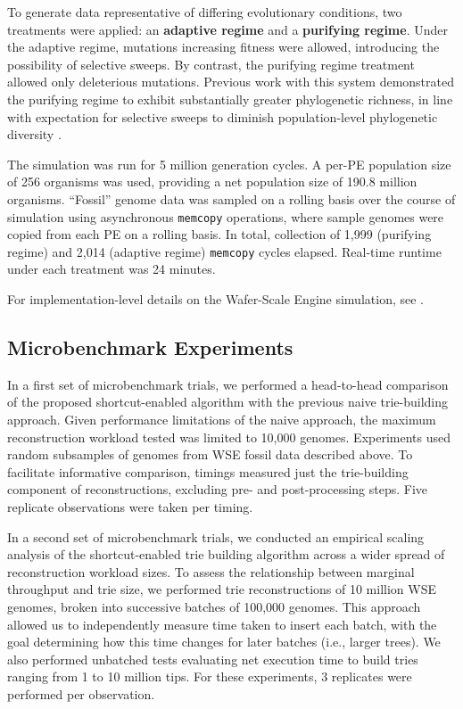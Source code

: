 To generate data representative of differing evolutionary conditions, two treatments were applied: an
\textbf{adaptive regime} and a \textbf{purifying regime}.
Under the adaptive regime, mutations increasing fitness were allowed, introducing the possibility of selective sweeps.
By contrast, the purifying regime treatment allowed only deleterious mutations.
Previous work with this system demonstrated the purifying regime to exhibit substantially greater phylogenetic richness, in line with expectation for selective sweeps to diminish population-level phylogenetic diversity \citep{moreno2024trackable}.

The simulation was run for 5 million generation cycles.
A per-PE population size of 256 organisms was used, providing a net population size of 190.8 million organisms.
``Fossil'' genome data was sampled on a rolling basis over the course of simulation using asynchronous \texttt{memcopy} operations, where sample genomes were copied from each PE on a rolling basis.
In total, collection of 1,999 (purifying regime) and 2,014 (adaptive regime) \texttt{memcopy} cycles elapsed.
Real-time runtime under each treatment was 24 minutes.

For implementation-level details on the Wafer-Scale Engine simulation, see \citep{moreno2024trackable}.

\subsection{Microbenchmark Experiments}

In a first set of microbenchmark trials, we performed a head-to-head comparison of the proposed shortcut-enabled algorithm with the previous naive trie-building approach.
Given performance limitations of the naive approach, the maximum reconstruction workload tested was limited to 10,000 genomes.
Experiments used random subsamples of genomes from WSE fossil data described above.
To facilitate informative comparison, timings measured just the trie-building component of reconstructions, excluding pre- and post-processing steps.
Five replicate observations were taken per timing.

In a second set of microbenchmark trials, we conducted an empirical scaling analysis of the shortcut-enabled trie building algorithm across a wider spread of reconstruction workload sizes.
To assess the relationship between marginal throughput and trie size, we performed trie reconstructions of 10 million WSE genomes, broken into successive batches of 100,000 genomes.
This approach allowed us to independently measure time taken to insert each batch, with the goal determining how this time changes for later batches (i.e., larger trees).
We also performed unbatched tests evaluating net execution time to build tries ranging from 1 to 10 million tips.
For these experiments, 3 replicates were performed per observation.

